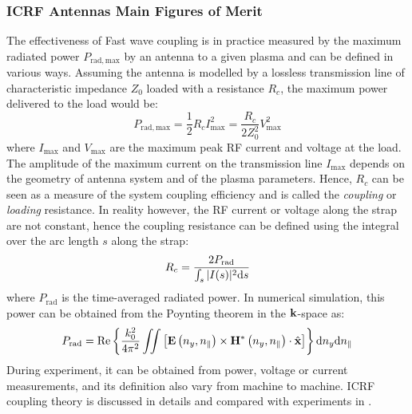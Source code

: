 \subsubsection{ICRF Antennas Main Figures of Merit}
The effectiveness of Fast wave coupling is in practice measured by the maximum radiated power $P_{\mathrm{rad,max}}$ by an antenna to a given plasma and can be defined in various ways. Assuming the antenna is modelled by a lossless transmission line of characteristic impedance $Z_0$ loaded with a  resistance $R_c$, the maximum power delivered to the load would be:
\begin{equation}
P_\mathrm{rad,max} = \frac{1}{2} R_c I^2_{\mathrm{max}} = \frac{R_c}{2 Z_0^2} V_\mathrm{max}^2
\end{equation}
where $I_\mathrm{max}$ and $V_\mathrm{max}$ are the maximum peak RF current and voltage at the load. The amplitude of the maximum current on the transmission line $I_\mathrm{max}$ depends on the geometry of antenna system and of the plasma parameters. Hence, $R_c$ can be seen as a measure of the system coupling efficiency and is called the \textit{coupling} or \textit{loading} resistance. In reality however, the RF current or voltage along the strap are not constant, hence the coupling resistance can be defined using the integral over the arc length $s$ along the strap:
\begin{equation}
	R_c = \frac{2 P_{\mathrm{rad}}}{\int_s |I(s)|^2 {\mathrm{d}} s}
\end{equation}
where $P_\mathrm{rad}$ is the time-averaged radiated power. In numerical simulation, this power can be obtained from the Poynting theorem in the ${\mathbf k}$-space as:
\begin{equation}
	P_\mathrm{rad}
	=
	\Re
	\left\{ 
	\frac{k_{0}^{2}}{4\pi^{2}}
	\iint
	\left[
	{\mathbf E} \left(n_{y},n_{\parallel}\right)
	\times
	{\mathbf H}^{*} \left(n_{y},n_{\parallel}\right)
	\cdot\hat{{\mathbf x}}
	\right]
	\right\} 
	{\mathrm{d}} n_y 
	{\mathrm{d}} n_\parallel
\end{equation}
During experiment, it can be obtained from power, voltage or current measurements, and its definition also vary from machine to machine. ICRF coupling theory is discussed in details  and compared with experiments in .


